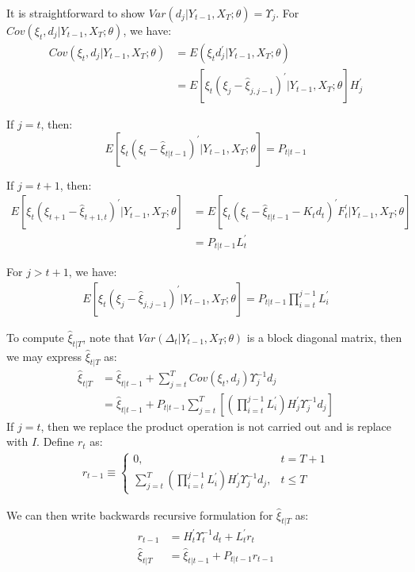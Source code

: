 \documentclass[10pt]{article}
\numberwithin{equation}{section}
\begin{document}
It is straightforward to show $Var(d_j|Y_{t-1},X_T;\theta)=\Upsilon_j$. For $Cov(\xi_t,d_j|Y_{t-1},X_T;\theta)$, we have:
\begin{align*}
    Cov(\xi_t,d_j|Y_{t-1},X_T;\theta) &= E(\xi_td_j^{'}|Y_{t-1},X_T;\theta) \\
    &= E[\xi_t(\xi_j-\hat{\xi}_{j,j-1})^{'}|Y_{t-1},X_T;\theta]H_j^{'} 
\end{align*}

If $j=t$, then:
\[
    E[\xi_t(\xi_t-\hat{\xi}_{t|t-1})^{'}|Y_{t-1},X_T;\theta] = P_{t|t-1}
\]

If $j=t+1$, then:
\begin{align*}
    E[\xi_t(\xi_{t+1}-\hat{\xi}_{t+1,t})^{'}|Y_{t-1},X_T;\theta] &= E[\xi_t(\xi_t-\hat{\xi}_{t|t-1}-K_td_t)^{'}F_t^{'}|Y_{t-1},X_T;\theta] \\
    &= P_{t|t-1}L_t^{'}
\end{align*}

For $j>t+1$, we have:
\begin{align*}
    E[\xi_t(\xi_{j}-\hat{\xi}_{j,j-1})^{'}|Y_{t-1},X_T;\theta] = P_{t|t-1}\prod_{i=t}^{j-1}L_i^{'}
\end{align*}

To compute $\hat{\xi}_{t|T}$, note that $Var(\Delta_{t}|Y_{t-1},X_T;\theta)$ is a block diagonal matrix, then we may express $\hat{\xi}_{t|T}$ as:
\begin{align*}
    \hat{\xi}_{t|T} &= \hat{\xi}_{t|t-1} + \sum_{j=t}^{T}Cov(\xi_t,d_j)\Upsilon_j^{-1}d_j \\
    &= \hat{\xi}_{t|t-1} + P_{t|t-1}\sum_{j=t}^T\left[\left(\prod_{i=t}^{j-1}L_{i}^{'}\right)H_j^{'}\Upsilon_j^{-1}d_j\right]
\end{align*}
If $j=t$, then we replace the product operation is not carried out and is replace with $I$. Define $r_t$ as:
\begin{align*}
    r_{t-1} \equiv \begin{cases}
        0, & t=T+1 \\
        \sum_{j=t}^T\left(\prod_{i=t}^{j-1}L_{i}^{'}\right)H_j^{'}\Upsilon_j^{-1}d_j, & t\leq T
    \end{cases}
\end{align*}

We can then write backwards recursive formulation for $\hat{\xi}_{t|T}$ as:
\begin{align*}
    r_{t-1} &= H_t^{'}\Upsilon_t^{-1}d_t + L_t^{'}r_t \\
    \hat{\xi}_{t|T} &= \hat{\xi}_{t|t-1} + P_{t|t-1}r_{t-1} 
\end{align*}
\end{document}
